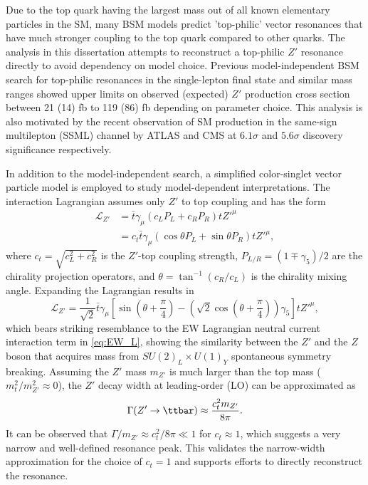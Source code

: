\documentclass[../thesis.tex]{subfiles}
\begin{document}
Due to the top quark having the largest mass out of all known elementary particles in the \acs{SM}, many \acs{BSM} models \citep{Ferretti:2013kya,Vecchi:2015fma,Agashe:2003zs,Agashe:2004rs} predict 'top-philic' vector resonances that have much stronger coupling to the top quark compared to other quarks. The analysis in this dissertation attempts to reconstruct a top-philic $Z'$ resonance directly to avoid dependency on model choice. Previous model-independent \acs{BSM} \tttt search for top-philic resonances \citep{theory:ttZp_1los} in the single-lepton final state and similar mass ranges showed upper limits on observed (expected) $Z'$ production cross section between 21 (14) fb to 119 (86) fb depending on parameter choice. This analysis is also motivated by the recent observation of \acs{SM} \tttt production in the same-sign multilepton (\acs{SSML}) channel by ATLAS \citep{tttt_obs} and CMS \citep{tttt_obs_cms} at $6.1\sigma$ and $5.6\sigma$ discovery significance respectively.

In addition to the model-independent search, a simplified color-singlet vector particle model \citep{theory:ttZp,theory:ttZp_LHC} is employed to study model-dependent interpretations. The interaction Lagrangian assumes only $Z'$ to top coupling and has the form
\begin{equation}
\begin{aligned}
\mathcal{L}_{Z'} &= \bar{t}\gamma_\mu\left(c_L P_L + c_R P_R\right) tZ'^{\mu}\\
&= c_t \bar{t}\gamma_\mu\left(\cos\theta P_L + \sin\theta P_R\right) tZ'^{\mu},
\end{aligned}
\end{equation}
where $c_t=\sqrt{c_L^2+c_R^2}$ is the $Z'$-top coupling strength, $P_{L/R}=(1\mp \gamma_5)/2$ are the chirality projection operators, and $\theta = \tan^{-1}(c_R/c_L)$ is the chirality mixing angle. Expanding the Lagrangian results in
\begin{equation}
\mathcal{L}_{Z'} = \frac{1}{\sqrt{2}}\bar{t}\gamma_\mu\left[
\sin\left(\theta+\frac{\pi}{4}\right) - \left(\sqrt{2}\cos\left(\theta+\frac{\pi}{4}\right)\right)\gamma_5
\right] tZ'^{\mu},
\end{equation}
which bears striking resemblance to the \acs{EW} Lagrangian neutral current interaction term in \autoref{eq:EW_L}, showing the similarity between the $Z'$ and the $Z$ boson that acquires mass from $SU(2)_L\times U(1)_Y$ spontaneous symmetry breaking. Assuming the $Z'$ mass $m_{Z'}$ is much larger than the top mass ($m_t^2/m_{Z'}^2 \approx 0$), the $Z'$ decay width at leading-order (\acs{LO}) can be approximated as
\begin{equation}
\Gamma(Z' \rightarrow \ttbar) \approx \frac{c_t^2 m_{Z'}}{8\pi}.
\end{equation}
It can be observed that $\Gamma/m_{Z'} \approx c_t^2/8\pi \ll 1$ for $c_t\approx 1$, which suggests a very narrow and well-defined resonance peak. This validates the narrow-width approximation for the choice of $c_t=1$ and supports efforts to directly reconstruct the resonance.
\end{document}
